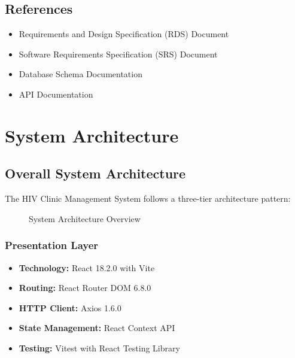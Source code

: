 \documentclass[12pt,a4paper]{article}
\begin{document}
\subsection{References}
\begin{itemize}
    \item Requirements and Design Specification (RDS) Document
    \item Software Requirements Specification (SRS) Document
    \item Database Schema Documentation
    \item API Documentation
\end{itemize}

\section{System Architecture}

\subsection{Overall System Architecture}

The HIV Clinic Management System follows a three-tier architecture pattern:

\begin{figure}[H]
\centering
{}
\caption{System Architecture Overview}
\label{fig:system-architecture}
\end{figure}

\subsubsection{Presentation Layer}
\begin{itemize}
    \item \textbf{Technology:} React 18.2.0 with Vite
    \item \textbf{Routing:} React Router DOM 6.8.0
    \item \textbf{HTTP Client:} Axios 1.6.0
    \item \textbf{State Management:} React Context API
    \item \textbf{Testing:} Vitest with React Testing Library
\end{itemize}
\end{document}
